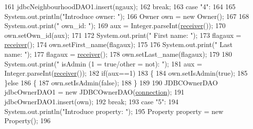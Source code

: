 \begin{DoxyCode}
161                         jdbcNeighbourhoodDAO1.insert(ngaux);
162                     \textcolor{keywordflow}{break};
163                     \textcolor{keywordflow}{case} \textcolor{stringliteral}{"4"}:
164                         
165                         System.out.println(\textcolor{stringliteral}{"Introduce owner: "});
166                         Owner own = \textcolor{keyword}{new} Owner();
167                         
168                         System.out.print(\textcolor{stringliteral}{"    own\_id: "});
169                         aux =  Integer.parseInt(\mbox{\hyperlink{classcms_1_1_c_m_s_ad13be0e97a0bb295dcedd134942a79b4}{receiver}}());
170                         own.setOwn\_id(aux);
171                         
172                         System.out.print(\textcolor{stringliteral}{"    First name: "});
173                         flagaux = \mbox{\hyperlink{classcms_1_1_c_m_s_ad13be0e97a0bb295dcedd134942a79b4}{receiver}}();
174                         own.setFirst\_name(flagaux);
175                         
176                         System.out.print(\textcolor{stringliteral}{"    Last name: "});
177                         flagaux = \mbox{\hyperlink{classcms_1_1_c_m_s_ad13be0e97a0bb295dcedd134942a79b4}{receiver}}();
178                         own.setLast\_name(flagaux);
179                         
180                         System.out.print(\textcolor{stringliteral}{"    isAdmin (1 = true/other = not): "});
181                         aux =  Integer.parseInt(\mbox{\hyperlink{classcms_1_1_c_m_s_ad13be0e97a0bb295dcedd134942a79b4}{receiver}}());
182                         \textcolor{keywordflow}{if}(aux==1)
183                         \{
184                                 own.setIsAdmin(\textcolor{keyword}{true});
185                         \}\textcolor{keywordflow}{else}
186                         \{
187                                 own.setIsAdmin(\textcolor{keyword}{false});
188                         \}
189                         
190                         JDBCOwnerDAO jdbcOwnerDAO1 = \textcolor{keyword}{new} JDBCOwnerDAO(\mbox{\hyperlink{classcms_1_1_c_m_s_afc28cfd2c4356509b85775219b7b1e05}{connection}});
191                         jdbcOwnerDAO1.insert(own);
192                     \textcolor{keywordflow}{break};
193                     \textcolor{keywordflow}{case} \textcolor{stringliteral}{"5"}:
194                         System.out.println(\textcolor{stringliteral}{"Introduce property: "});
195                         Property \textcolor{keyword}{property} = \textcolor{keyword}{new} Property();
196                         

\end{DoxyCode}
